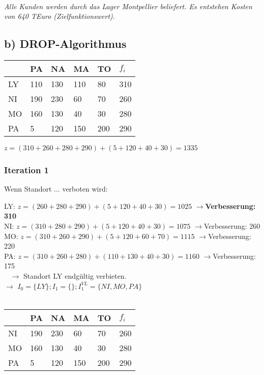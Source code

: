 \documentclass[a4paper,11pt]{article}
\begin{document}
~\newline

\textit{Alle Kunden werden durch das Lager Montpellier beliefert. Es entstehen Kosten von 640 TEuro (Zielfunktionswert).} \\

\subsection*{b) DROP-Algorithmus}
\begin{tabular}{l|l|l|l|l|l}
      & PA & NA & MA & TO & $f_i$ \\ \hline
  LY  & 110 & 130 & 110 & 80 & 310 \\ \hline
  NI  & 190 & 230 & 60 & 70 & 260 \\ \hline
  MO  & 160 & 130 & 40 & 30 & 280 \\ \hline
  PA  & 5 & 120 & 150 & 200 & 290 \\ 
\end{tabular} \newline

$z = (310 + 260 + 280 + 290) + (5 + 120 + 40 + 30) = 1335$ \\

\subsubsection*{Iteration 1}
Wenn Standort ... verboten wird: \newline

LY: $z = (260 + 280 + 290) + (5 + 120 + 40 + 30) = 1025$ $\to$\textbf{Verbesserung: 310} \\
NI: $z = (310 + 280 + 290) + (5 + 120 + 40 + 30) = 1075$ $\to$Verbesserung: 260 \\
MO: $z = (310 + 260 + 290) + (5 + 120 + 60 + 70) = 1115$ $\to$Verbesserung: 220 \\
PA: $z = (310 + 260 + 280) + (110 + 130 + 40 + 30) = 1160$ $\to$Verbesserung: 175 \\
~\newline
$\longrightarrow$ Standort LY endgültig verbieten. \\
$\longrightarrow$ $I_0 = \{LY\}; I_1 = \{ \}; I_1^{VL} = \{NI, MO, PA\}$ \\
~\newline

\begin{tabular}{l|l|l|l|l|l}
    & PA & NA & MA & TO & $f_i$ \\ \hline
NI  & 190 & 230 & 60 & 70 & 260 \\ \hline
MO  & 160 & 130 & 40 & 30 & 280 \\ \hline
PA  & 5 & 120 & 150 & 200 & 290 \\ 
\end{tabular} \newline
\end{document}
